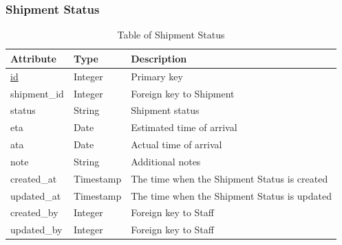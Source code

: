 \subsubsection{Shipment Status}
\begin{table}[H]
    \centering
    \begin{tabular}{|p{3cm}|p{2cm}|p{\dimexpr\textwidth-6.8cm}|} %
        \hline
        \rowcolor[HTML]{C0C0C0} 
        \textbf{Attribute} & \textbf{Type} & \textbf{Description} \\ \hline
        \underline{id} & Integer & Primary key \\ \hline
        shipment\_id & Integer & Foreign key to Shipment \\ \hline
        status & String & Shipment status \\ \hline
        eta & Date & Estimated time of arrival \\ \hline
        ata & Date & Actual time of arrival \\ \hline
        note & String & Additional notes \\ \hline
        created\_at & Timestamp & The time when the Shipment Status is created \\ \hline
        updated\_at & Timestamp & The time when the Shipment Status is updated \\ \hline
        created\_by & Integer & Foreign key to Staff \\ \hline
        updated\_by & Integer & Foreign key to Staff \\ \hline
    \end{tabular}
    \caption{Table of Shipment Status}
    \label{tab:shipment-status-table}
\end{table}

